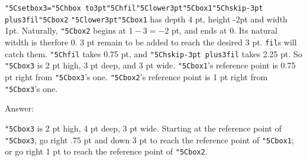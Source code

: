 \def\\{\char"5C}
\def\1{{\tt \\box1}}
\def\2{{\tt \\box2}}
\def\3{{\tt \\box3}}
{\tt \\setbox3=\\hbox to3pt{\\hfil\\lower3pt\\box1\\hskip-3pt plus3fil\\box2}}
{\tt \\lower3pt\\box1} has depth 4 pt, height -2pt and width 1pt.
Naturally, \2 begins at $1 - 3 = -2$ pt, and ends at 0.
Its natural witdth is therfore 0.
3 pt remain to be added to reach the desired 3 pt. {\tt fil}s will catch them.
{\tt \\hfil} takes 0.75 pt, and {\tt \\hskip-3pt plus3fil} takes 2.25 pt.
So \3 is 2 pt high, 3 pt deep, and 3 pt wide.
\1's reference point is 0.75 pt right from \3's one.
\2's reference point is 1 pt right from \3's one.

Answer:

\3 is 2 pt high, 4 pt deep, 3 pt wide. Starting at the reference point of
\3, go right .75 pt and down 3 pt to reach the reference point of \1; or go right
1 pt to reach the reference point of \2.
\bye

